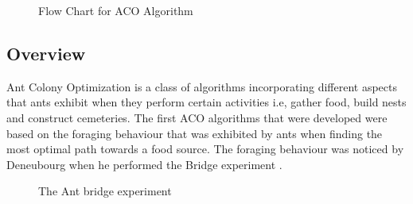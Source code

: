 \begin{figure}[p]
	\begin{center}
	\caption{Flow Chart for ACO Algorithm}
	\label{fig:ACOAlgorithmFlowChart}
	\end{center}
\end{figure}
\subsection{Overview}
\label{sec:ACOverview}
Ant Colony Optimization is a class of algorithms incorporating different aspects that ants exhibit when they perform certain activities i.e, gather food, build nests and construct cemeteries. The first ACO algorithms that were developed were based on the foraging behaviour that was exhibited by ants when finding the most optimal path towards a food source. The foraging behaviour was noticed by Deneubourg when he performed the Bridge experiment \cite{AntsAndStigmergy,CompuIntelligenceIntro}.
\begin{figure}[b!]
	\centering
	\setlength \fboxsep{0pt}
	\setlength \fboxrule{0.5pt}
	\caption{The Ant bridge experiment \cite{AntsAndStigmergy}}
	\label{fig:antBridgeExperiment}
\end{figure}

